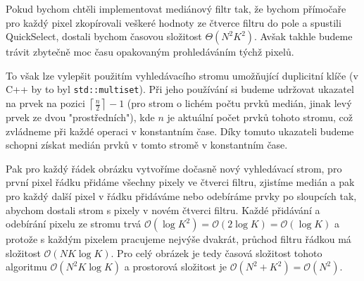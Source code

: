 \documentclass{fkssolpub}
\author{Ondřej Sedláček}
\begin{document}
 

Pokud bychom chtěli implementovat mediánový filtr tak, že bychom přímočaře pro každý
pixel zkopírovali veškeré hodnoty ze čtverce filtru do pole a spustili QuickSelect,
dostali bychom časovou složitost $\Theta(N^2K^2)$. Avšak takhle budeme trávit zbytečně
moc času opakovaným prohledáváním týchž pixelů.

To však lze vylepšit použitím vyhledávacího stromu umožňující duplicitní klíče
(v C++ by to byl \verb|std::multiset|). Při jeho používání si budeme udržovat
ukazatel na prvek na pozici $\left\lceil \frac{n}{2} \right\rceil - 1$ (pro strom
o lichém počtu prvků medián, jinak levý prvek ze dvou "prostředních"), kde $n$ je
aktuální počet prvků tohoto stromu, což zvládneme při každé operaci v konstantním
čase. Díky tomuto ukazateli budeme schopni získat medián prvků v tomto stromě v
konstantním čase.

Pak pro každý řádek obrázku vytvoříme dočasně nový vyhledávací strom, pro první pixel řádku
přidáme všechny pixely ve čtverci filtru, zjistíme medián a pak pro každý další pixel
v řádku přidáváme nebo odebíráme prvky po sloupcích tak, abychom dostali strom s pixely
v novém čtverci filtru. Každé přidávání a odebírání pixelu ze stromu trvá 
$\mathcal{O}(\log K^2) = \mathcal{O}(2 \log K) = \mathcal{O}(\log K)$ a protože
s každým pixelem pracujeme nejvýše dvakrát, průchod filtru řádkou má složitost
$\mathcal{O}(N K \log K)$. Pro celý obrázek je tedy časová složitost tohoto algoritmu
$\mathcal{O}(N^2 K \log K)$ a prostorová složitost je 
$\mathcal{O}(N^2 + K^2) = \mathcal{O}(N^2)$.
\end{document}
